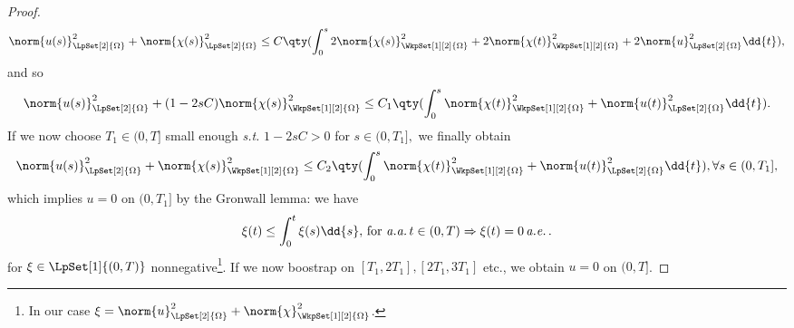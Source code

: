 \begin{proof}
	\[
		\norm{u(s)}_{\LpSet[2]{\Omega}}^{2} + \norm{\chi(s)}_{\LpSet[2]{\Omega}}^{2} \leq C\qty(\int_0^s 2 \norm{\chi(s)}_{\WkpSet[1][2]{\Omega}}^{2}+ 2\norm{\chi(t)}_{\WkpSet[1][2]{\Omega}}^{2} + 2 \norm{u}_{\LpSet[2]{\Omega}}^{2}\dd{t}),
	\]
	and so
	\[
		\norm{u(s)}_{\LpSet[2]{\Omega}}^{2} + (1-2sC) \norm{\chi(s)}_{\WkpSet[1][2]{\Omega}}^{2} \leq C_1 \qty(\int_0^s \norm{\chi(t)}_{\WkpSet[1][2]{\Omega}}^{2} + \norm{u(t)}_{\LpSet[2]{\Omega}}^{2} \dd{t}).
	\]
	If we now choose $T_1 \in (0,T]$ small enough \textit{s.t.} $1-2sC > 0$ for $s \in (0,T_1],$ we finally obtain
	\[
		\norm{u(s)}_{\LpSet[2]{\Omega}}^{2} + \norm{\chi(s)}_{\WkpSet[1][2]{\Omega}}^{2} \leq C_2 \qty(\int_0^s \norm{\chi(t)}_{\WkpSet[1][2]{\Omega}}^{2} + \norm{u(t)}_{\LpSet[2]{\Omega}}^{2}\dd{t}), \forall s \in (0,T_1],
	\]
which implies $u = 0$ on $(0,T_1]$ by the Gronwall lemma: we have
\[
	\xi(t) \leq \int_0^t \xi(s) \dd{s}, \, \text{for} \, \, \text{\textit{a.a.}} \, t \in (0,T) \Rightarrow \xi(t) = 0 \, \text{\textit{a.e.}} \,.
\]
for $\xi \in \LpSet[1]{(0,T)}$ nonnegative\footnote{In our case $\xi = \norm{u}_{\LpSet[2]{\Omega}}^{2} + \norm{\chi}_{\WkpSet[1][2]{\Omega}}^{2}$.}.
If we now boostrap on $[T_1, 2T_1], [2T_1, 3T_1]$ etc., we obtain $u = 0$ on $(0,T]$.


\end{proof}


